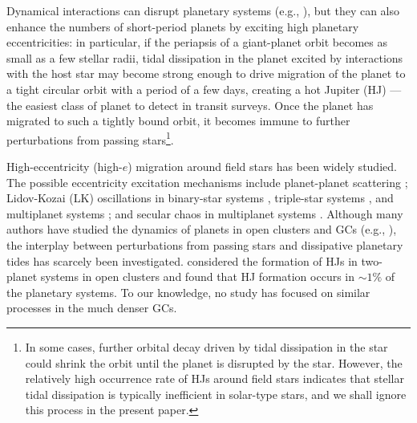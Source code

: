 \documentclass[iop,usenatbib]{emulateapj}
\begin{document}
Dynamical interactions can disrupt planetary systems (e.g., \citealt{1992ApJ...399L..95S}), but they can also enhance the numbers of short-period planets by exciting high planetary eccentricities: in particular, if the periapsis of a giant-planet orbit becomes as small as a few stellar radii, tidal dissipation in the planet excited by interactions with the host star may become strong enough to drive migration of the planet to a tight circular orbit with a period of a few days, creating a hot Jupiter (HJ) --- the easiest class of planet to detect in transit surveys. Once the planet has migrated to such a tightly bound orbit, it becomes immune to further perturbations from passing stars\footnote{In some cases, further orbital decay driven by tidal dissipation in the star could shrink the orbit until the planet is disrupted by the star. However, the relatively high occurrence rate of HJs around field stars indicates that stellar tidal dissipation is typically inefficient in solar-type stars, and we shall ignore this process in the present paper.}.

High-eccentricity (high-$e$) migration around field stars has been widely studied. The possible eccentricity excitation mechanisms include planet-planet scattering \citep{1996Sci...274..954R,2008ApJ...686..580C,2008ApJ...686..621F,2008ApJ...686..603J,2008ApJ...678..498N,2012ApJ...751..119B}; Lidov-Kozai (LK) oscillations  \citep{1962P&SS....9..719L,1962AJ.....67..591K} in binary-star systems  \citep{2003ApJ...589..605W,2007ApJ...669.1298F,2012ApJ...754L..36N,2015ApJ...799...27P,2016MNRAS.456.3671A,2016ApJ...829..132P,2017ApJ...835L..24H}, triple-star systems \citep{2017MNRAS.466.4107H,2017arXiv171005920G}, and multiplanet systems \citep{2015ApJ...805...75P,2016ApJ...820...55X}; and secular chaos in multiplanet systems \citep{2011ApJ...735..109W,2011ApJ...739...31L,2014PNAS..11112610L,2017MNRAS.464..688H}. Although many authors have studied the dynamics of planets in open clusters and GCs (e.g., \citealt{1992ApJ...399L..95S,1997A&A...326L..21D,2001MNRAS.322..859B,2001MNRAS.324..612D,2006ApJ...640.1086F,2009ApJ...697..458S,2011MNRAS.411..859M,2012ApJ...754...57B,2012MNRAS.427.1587C,2012MNRAS.419.2448P,2013MNRAS.433..867H,2013ApJ...772..142L,2015MNRAS.448..344L,2015MNRAS.449.3543W,2015MNRAS.453.2759Z,doi:10.1093/mnras/stx1464}), the interplay between perturbations from passing stars and dissipative planetary tides has scarcely been investigated. \citet{2016ApJ...816...59S} considered the formation of HJs in two-planet systems in open clusters and found that HJ formation occurs in $\sim 1\%$ of the planetary systems. To our knowledge, no study has focused on similar processes in the much denser GCs.
\end{document}
